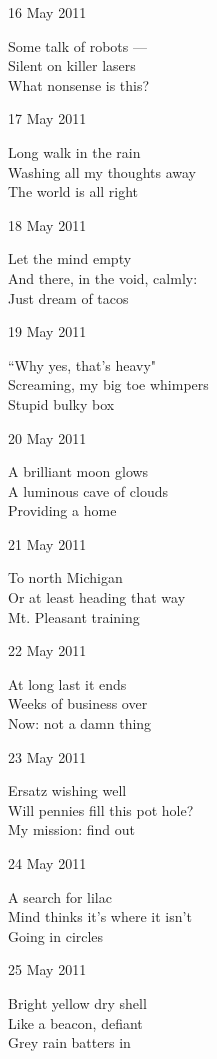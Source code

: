 \documentclass[12pt]{article}
\begin{document}
16 May 2011

Some talk of robots --- \\
Silent on killer lasers \\
What nonsense is this?


\newpage

17 May 2011

Long walk in the rain \\
Washing all my thoughts away \\
The world is all right

18 May 2011

Let the mind empty \\
And there, in the void, calmly: \\
Just dream of tacos

19 May 2011

``Why yes, that's heavy" \\
Screaming, my big toe whimpers \\
Stupid bulky box

20 May 2011

A brilliant moon glows \\
A luminous cave of clouds \\
Providing a home

21 May 2011

To north Michigan \\
Or at least heading that way \\
Mt. Pleasant training

22 May 2011

At long last it ends \\
Weeks of business over \\
Now: not a damn thing

23 May 2011

Ersatz wishing well \\
Will pennies fill this pot hole? \\
My mission: find out


\newpage

24 May 2011

A search for lilac \\
Mind thinks it's where it isn't \\
Going in circles

25 May 2011

Bright yellow dry shell \\
Like a beacon, defiant \\
Grey rain batters in
\end{document}
